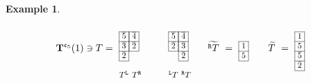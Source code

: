 \documentclass[leqno,11pt]{amsart}
\newtheorem{ex}[thm]{\bf Example}
\numberwithin{equation}{section}
\newcommand{\td}{\widetilde}
\newcommand{\mf}{\mathfrak}
\begin{document}
\begin{ex}{\rm
$$
{\bf T}^{\mf c_5}(1) \ni T=\ 
\resizebox{.06\hsize}{!}{$
{\def\lr#1{\multicolumn{1}{|@{\hspace{.75ex}}c@{\hspace{.75ex}}|}{\raisebox{-.04ex}{$#1$}}}\raisebox{-.6ex}
{$\begin{array}{cc}
\\
\cline{1-1}\cline{2-2}
\lr{\overline{5}}&\lr{\overline{4}}\\ 
\cline{1-1}\cline{2-2}
\lr{\overline{3}}&\lr{\overline{2}}\\ 
\cline{1-1}\cline{2-2}
\lr{\overline{2}}\\ 
\cline{1-1} \\
\!\!\! T^{\tt L}\!\!\! & \!\! T^{\tt R}\!\!\!\!\!\!
\end{array}$}}$}\  \ \ \ \ \ \ \ \  
\resizebox{.06\hsize}{!}{$
{\def\lr#1{\multicolumn{1}{|@{\hspace{.75ex}}c@{\hspace{.75ex}}|}{\raisebox{-.04ex}{$#1$}}}\raisebox{-.6ex}
{$\begin{array}{cc}
\\
\cline{1-1}\cline{2-2}
\lr{\overline{5}}&\lr{\overline{4}}\\ 
\cline{1-1}\cline{2-2}
\lr{\overline{2}}&\lr{\overline{3}}\\ 
\cline{1-1}\cline{2-2}
&\lr{\overline{2}}\\ 
\cline{2-2}  \\
\!\!\! {}^{\tt L}T\!\!\! & \!\! {}^{\tt R}T\!\!\!\!\!\!

\end{array}$}}$}\ \ \ \ \ \  \td{{}^{\tt R}T} \ = \
\resizebox{.03\hsize}{!}{$
{\def\lr#1{\multicolumn{1}{|@{\hspace{.75ex}}c@{\hspace{.75ex}}|}{\raisebox{-.04ex}{$#1$}}}\raisebox{-.6ex}
{$\begin{array}{c}
\cline{1-1} 
\lr{1} \\ 
\cline{1-1} 
\lr{5} \\ 
\cline{1-1}   
\end{array}$}}$}\ \ \ \ \ \  \td{T} \ = \
\resizebox{.03\hsize}{!}{$
{\def\lr#1{\multicolumn{1}{|@{\hspace{.75ex}}c@{\hspace{.75ex}}|}{\raisebox{-.04ex}{$#1$}}}\raisebox{-.6ex}
{$\begin{array}{c}
\cline{1-1} 
\lr{1} \\ 
\cline{1-1} 
\lr{5} \\ 
\cline{1-1}   
\lr{\overline{5}}\\ 
\cline{1-1}
\lr{\overline{2}}\\ 
\cline{1-1}  
\end{array}$}}$}
$$}
\end{ex}
\end{document}
